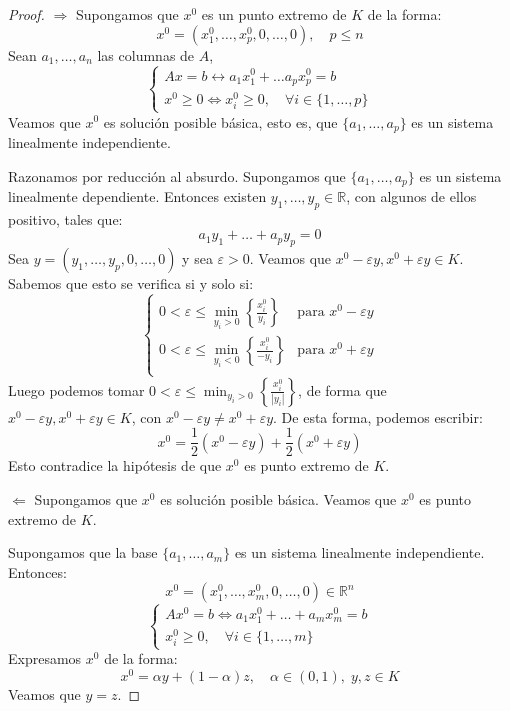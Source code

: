 \begin{proof}
    \hfill \break
    $\boxed{\Rightarrow}$ Supongamos que $x^0$ es un punto extremo de $K$ de la forma:
    $$x^0 = (x^0_1, \dots, x^0_p, 0, \dots, 0), \quad p \leq n$$
    Sean $a_1, \dots, a_n$ las columnas de $A$,
    $$\begin{cases}
            Ax = b \leftrightarrow a_1x^0_1 + \dots a_px^0_p = b \\
            x^0 \geq 0 \Leftrightarrow x^0_i \geq 0, \quad \forall i \in \{1, \dots, p\}
        \end{cases}$$
    Veamos que $x^0$ es solución posible básica, esto es, que $\{a_1, \dots, a_p\}$ es un sistema linealmente independiente.

    Razonamos por reducción al absurdo.
    Supongamos que $\{a_1, \dots, a_p\}$ es un sistema linealmente dependiente.
    Entonces existen $y_1, \dots, y_p \in \mathbb{R}$, con algunos de ellos positivo, tales que:
    $$a_1y_1 + \dots + a_py_p = 0$$
    Sea $y = (y_1, \dots, y_p, 0, \dots, 0)$ y sea $\varepsilon > 0$.
    Veamos que $x^0 - \varepsilon y, x^0 + \varepsilon y \in K$.
    Sabemos que esto se verifica si y solo si:
    $$\begin{cases}
            0 < \varepsilon \leq \min_{y_i > 0} \left\{\frac{x^0_i}{y_i}\right\}  & \text{para } x^0 - \varepsilon y \\
            0 < \varepsilon \leq \min_{y_i < 0} \left\{\frac{x^0_i}{-y_i}\right\} & \text{para } x^0 + \varepsilon y \\
        \end{cases}$$
    Luego podemos tomar $0 < \varepsilon \leq \min_{y_i > 0} \left\{\frac{x^0_i}{|y_i|}\right\}$, de forma que $x^0 - \varepsilon y, x^0 + \varepsilon y \in K$, con $x^0 - \varepsilon y \neq x^0 + \varepsilon y$.
    De esta forma, podemos escribir:
    $$x^0 = \frac{1}{2}(x^0 - \varepsilon y) + \frac{1}{2}(x^0 + \varepsilon y)$$
    Esto contradice la hipótesis de que $x^0$ es punto extremo de $K$.

    $\boxed{\Leftarrow}$ Supongamos que $x^0$ es solución posible básica.
    Veamos que $x^0$ es punto extremo de $K$.

    Supongamos que la base $\{a_1, \dots, a_m\}$ es un sistema linealmente independiente.
    Entonces:
    $$x^0 = (x^0_1, \dots, x^0_m, 0, \dots, 0) \in \mathbb{R}^n$$
    $$\begin{cases}
            Ax^0 = b \Leftrightarrow a_1x^0_1 + \dots + a_mx^0_m = b \\
            x^0_i \geq 0, \quad \forall i \in \{1, \dots, m\}
        \end{cases}$$
    Expresamos $x^0$ de la forma:
    $$x^0 = \alpha y + (1-\alpha)z, \quad \alpha \in (0, 1), \; y, z \in K$$
    Veamos que $y = z$.


\end{proof}
